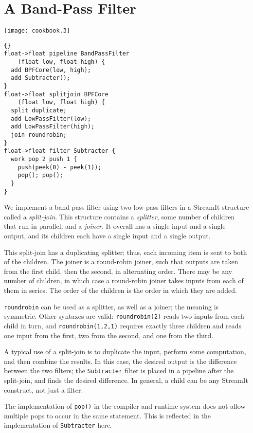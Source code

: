 \section{A Band-Pass Filter}

\begin{textpic}{\texttt{[image: cookbook.3]}}
\begin{lstlisting}{}
float->float pipeline BandPassFilter
    (float low, float high) {
  add BPFCore(low, high);
  add Subtracter();
}
float->float splitjoin BPFCore
    (float low, float high) {
  split duplicate;
  add LowPassFilter(low);
  add LowPassFilter(high);
  join roundrobin;
}
float->float filter Subtracter {
  work pop 2 push 1 {
    push(peek(0) - peek(1));
    pop(); pop();
  }
}
\end{lstlisting}
\end{textpic}

We implement a band-pass filter using two low-pass filters in a
StreamIt structure called a \emph{split-join}.  This structure
contains a \emph{splitter}, some number of children that run in
parallel, and a \emph{joiner}.  It overall has a single input and a
single output, and its children each have a single input and a single
output.

This split-join has a duplicating splitter; thus, each incoming item
is sent to both of the children.  The joiner is a round-robin joiner,
such that outputs are taken from the first child, then the second, in
alternating order.  There may be any number of children, in which case
a round-robin joiner takes inputs from each of them in series.  The
order of the children is the order in which they are added.

\lstinline|roundrobin| can be used as a splitter, as well as a joiner;
the meaning is symmetric.  Other syntaxes are valid:
\lstinline|roundrobin(2)| reads two inputs from each child in turn,
and \lstinline|roundrobin(1,2,1)| requires exactly three children and
reads one input from the first, two from the second, and one from the
third.

A typical use of a split-join is to duplicate the input, perform some
computation, and then combine the results.  In this case, the desired
output is the difference between the two filters; the
\lstinline|Subtracter| filter is placed in a pipeline after the
split-join, and finds the desired difference.  In general, a child can
be any StreamIt construct, not just a filter.

The implementation of \lstinline|pop()| in the compiler and runtime
system does not allow multiple pops to occur in the same statement.
This is reflected in the implementation of \lstinline|Subtracter|
here.